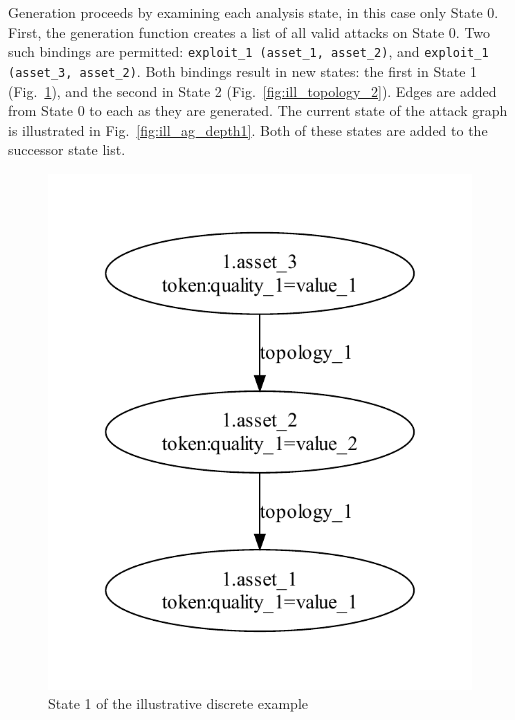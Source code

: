 Generation proceeds by examining each analysis state, in this case only State 0.
First, the generation function creates a list of all valid
attacks on State 0. Two such bindings are permitted: \texttt{exploit\_1 (asset\_1, asset\_2)},
and \texttt{exploit\_1 (asset\_3, asset\_2)}. Both bindings result in new states:
the first in State 1 (Fig.~\ref{fig:ill_topology_1}), and the second in State 2
(Fig.~\ref{fig:ill_topology_2}). Edges are added from State 0 to each as they are
generated. The current state of the attack graph is illustrated in 
Fig.~\ref{fig:ill_ag_depth1}. Both of these states are added to the
successor state list.

\begin{figure}
\centering
\includegraphics[height=0.4\textheight]{ag_illustrative_simple/nm_state1}
\caption{State 1 of the illustrative discrete example}
\label{fig:ill_topology_1}
\end{figure}


